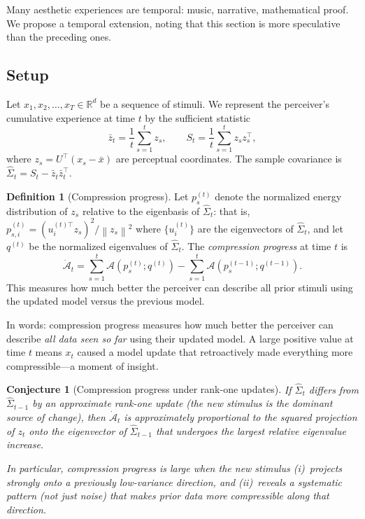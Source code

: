 \documentclass[journal]{IEEEtran}
\newtheorem{conjecture}[theorem]{Conjecture}
\theoremstyle{definition}
\newtheorem{definition}[theorem]{Definition}
\theoremstyle{remark}
\newcommand{\R}{\mathbb{R}}
\newcommand{\norm}[1]{\left\lVert #1 \right\rVert}
\begin{document}
Many aesthetic experiences are temporal: music, narrative,
mathematical proof.  We propose a temporal extension, noting
that this section is more speculative than the preceding ones.

\subsection{Setup}

Let $x_1, x_2, \ldots, x_T \in \R^d$ be a sequence of stimuli.
We represent the perceiver's cumulative experience at time $t$ by the
sufficient statistic
\begin{equation}
    \bar{z}_t = \frac{1}{t}\sum_{s=1}^t z_s, \qquad
    S_t = \frac{1}{t}\sum_{s=1}^t z_s z_s^\top,
    \label{eq:sufficient}
\end{equation}
where $z_s = U^\top(x_s - \bar{x})$ are perceptual coordinates.
The sample covariance is $\hat{\Sigma}_t = S_t - \bar{z}_t
\bar{z}_t^\top$.

\begin{definition}[Compression progress]
\label{def:progress}
Let $p_s^{(t)}$ denote the normalized energy distribution of $z_s$
relative to the eigenbasis of $\hat{\Sigma}_t$: that is,
$p_{s,i}^{(t)} = (u_i^{(t)\top} z_s)^2 / \norm{z_s}^2$
where $\{u_i^{(t)}\}$ are the eigenvectors of $\hat{\Sigma}_t$,
and let $q^{(t)}$ be the normalized eigenvalues of $\hat{\Sigma}_t$.
The \emph{compression progress} at time $t$ is
\begin{equation}
    \dot{\mathcal{A}}_t =
    \sum_{s=1}^t \mathcal{A}(p_s^{(t)}; q^{(t)})
    - \sum_{s=1}^t \mathcal{A}(p_s^{(t-1)}; q^{(t-1)}).
    \label{eq:progress}
\end{equation}
This measures how much better the perceiver can describe all prior
stimuli using the updated model versus the previous model.
\end{definition}

In words: compression progress measures how much better the
perceiver can describe \emph{all data seen so far} using their
updated model.  A large positive value at time $t$ means $x_t$
caused a model update that retroactively made everything more
compressible---a moment of insight.

\begin{conjecture}[Compression progress under rank-one updates]
\label{conj:progress}
If $\hat{\Sigma}_t$ differs from $\hat{\Sigma}_{t-1}$ by an
approximate rank-one update (the new stimulus is the dominant
source of change), then $\dot{\mathcal{A}}_t$ is approximately
proportional to the squared projection of $z_t$ onto the
eigenvector of $\hat{\Sigma}_{t-1}$ that undergoes the largest
relative eigenvalue increase.

In particular, compression progress is large when the new stimulus
(i)~projects strongly onto a previously low-variance direction, and
(ii)~reveals a systematic pattern (not just noise) that makes prior
data more compressible along that direction.
\end{conjecture}
\end{document}
